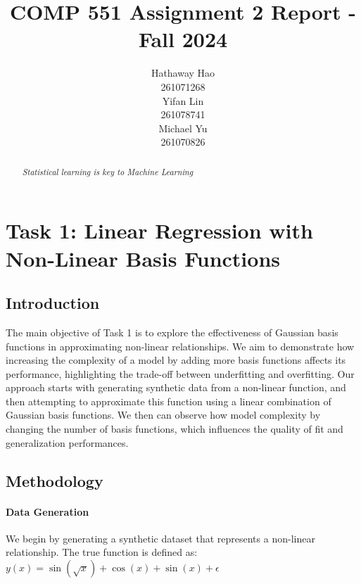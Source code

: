 \documentclass{article}
\title{COMP 551 Assignment 2 Report - Fall 2024}
\author{
 Hathaway Hao \\
  261071268\\
   \And
 Yifan Lin \\
  261078741\\
  \And
 Michael Yu \\
  261070826\\
}
\begin{document}
\maketitle
\begin{abstract}
\textit {Statistical learning is key to Machine Learning}

\end{abstract}



\section{Task 1: Linear Regression with Non-Linear Basis Functions}

\subsection{Introduction}
\noindent The main objective of Task 1 is to explore the effectiveness of Gaussian basis functions in approximating non-linear relationships. We aim to demonstrate how increasing the complexity of a model by adding more basis functions affects its performance, highlighting the trade-off between underfitting and overfitting. Our approach starts with generating synthetic data from a non-linear function, and then attempting to approximate this function using a linear combination of Gaussian basis functions. We then can observe how model complexity by changing the number of basis functions, which influences the quality of fit and generalization performances.


\subsection{Methodology}
\paragraph{Data Generation}
We begin by generating a synthetic dataset that represents a non-linear relationship. The true function is defined as: $y(x) = \sin(\sqrt{x}) + \cos(x) + \sin(x) + \epsilon$
\end{document}
